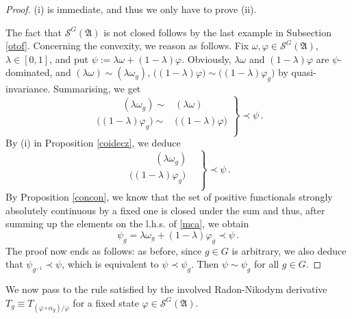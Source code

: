 \documentclass[12pt]{amsart}
\numberwithin{equation}{section}
\def\cs{{\mathcal S}}
\def\ga{{\mathfrak A}} \def\gpa{{\mathfrak a}}
\def\a{\alpha}
\def\l{\lambda} \def\L{\Lambda}
\def\f{\varphi}\def\ff{\phi} \def\F{\Phi}
\def\om{\omega} \def\Om{\Omega}
\begin{document}
\begin{proof}
(i) is immediate, and thus we only have to prove (ii).

The fact that $\cs^G(\ga)$ is not closed follows by the last example in Subsection \ref{otof}. Concerning the convexity, we reason as follows.
Fix $\om,\f\in\cs^G(\ga)$, $\l\in[0,1]$, and put $\psi:=\l\om+(1-\l)\f$. Obviously,
$\l\om$ and $(1-\l)\f$ are $\psi$-dominated, and $(\l\om)\sim(\l\om_g)$, $\big((1-\l)\f\big)\sim\big((1-\l)\f_g\big)$ by quasi-invariance.
Summarising, we get
\begin{equation*}
\left.
\begin{array}{ll}
\,\,\,\,\qquad(\l\om_g)\sim&\!\!\!(\l\om)\\
\big((1-\l)\f_g\big)\sim&\!\!\!\big((1-\l)\f\big)\\
\end{array}
\right\}\prec\psi\,.
\end{equation*}
By (i) in Proposition \ref{coidecz}, we deduce
\begin{equation}
\label{mca}
\left.
\begin{array}{ll}
\,\,\,\,\qquad(\l\om_g)&\\
\big((1-\l)\f_g\big)&\\
\end{array}
\right\}\prec\psi\,.
\end{equation}
By Proposition \ref{concon}, we know that the set of positive functionals strongly absolutely continuous by a fixed one is closed under the sum and thus, after summing up the elements on the l.h.s. of \eqref{mca}, we obtain
$$
\psi_g=\l\om_g+(1-\l)\f_g\prec\psi\,.
$$
The proof now ends as follows: as before, since $g\in G$ is arbitrary, we also deduce that $\psi_{g^{-1}}\prec\psi$, which is equivalent to
$\psi\prec\psi_g$. Then $\psi\sim\psi_g$ for all $g\in G$.
\end{proof}


We now pass to the rule satisfied by the involved Radon-Nikodym derivative $T_g\equiv T_{(\f\circ\a_g)/\f}$ for a fixed state $\f\in\cs^G(\ga)$.
\end{document}

